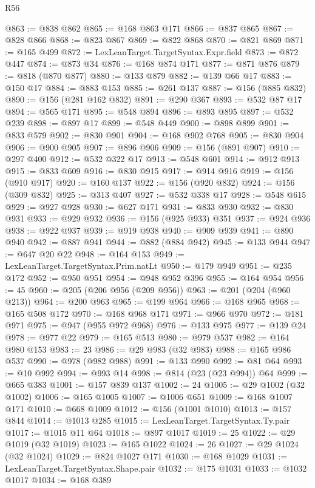 \begin{lexlean}{R56}
\begin{coremodule}
{{{{{{{{{{{{{{{{{{{{{{{{{{{{{{{{{{{{{{{{{{{{{{{{{{{{{{{{{{{{{{{{{{{{{{{{{{{{{{{{{{{{{{{{{{{{{{{{{{{{{{{{{{{{{{{{{{{{{{{{{{{{{{{{{{{{{{{{{{{{{{{{{{{{{{{{{{{{{{{{{{{{{{{{{{{{{{{{{{{{{{{{{{{{{{{{{{{{{{{{{{{{{{{{{{{@863 := @838 @862
@865 := @168 @863 @171
@866 := @837 @865
@867 := @828 @866
@868 := @823 @867
@869 := @822 @868
@870 := @821 @869
@871 := @165 @499
@872 := LexLeanTarget.TargetSyntax.Expr.field
@873 := @872 @447
@874 := @873 @34
@876 := @168 @874 @171
@877 := @871 @876
@879 := @818 (@870 @877)
@880 := @133 @879
@882 := @139 @66 @17
@883 := @150 @17
@884 := @883 @153
@885 := @261 @137
@887 := @156 (@885 @832)
@890 := @156 (@281 @162 @832)
@891 := @290 @367
@893 := @532 @87 @17
@894 := @565 @171
@895 := @548 @894
@896 := @893 @895
@897 := @532 @239
@898 := @897 @17
@899 := @548 @449
@900 := @898 @899
@901 := @833 @579
@902 := @830 @901
@904 := @168 @902 @768
@905 := @830 @904
@906 := @900 @905
@907 := @896 @906
@909 := @156 (@891 @907)
@910 := @297 @400
@912 := @532 @322 @17
@913 := @548 @601
@914 := @912 @913
@915 := @833 @609
@916 := @830 @915
@917 := @914 @916
@919 := @156 (@910 @917)
@920 := @160 @137
@922 := @156 (@920 @832)
@924 := @156 (@309 @832)
@925 := @313 @407
@927 := @532 @338 @17
@928 := @548 @615
@929 := @927 @928
@930 := @627 @171
@931 := @833 @930
@932 := @830 @931
@933 := @929 @932
@936 := @156 (@925 @933) @351
@937 := @924 @936
@938 := @922 @937
@939 := @919 @938
@940 := @909 @939
@941 := @890 @940
@942 := @887 @941
@944 := @882 (@884 @942)
@945 := @133 @944
@947 := @647 @20 @22
@948 := @164 @153
@949 := LexLeanTarget.TargetSyntax.Prim.natLt
@950 := @179 @949
@951 := @235 @172
@952 := @950 @951
@954 := @948 @952 @396
@955 := @164 @954
@956 := 45
@960 := @205 (@206 @956 (@209 @956))
@963 := @201 (@204 (@960 @213))
@964 := @200 @963
@965 := @199 @964
@966 := @168 @965
@968 := @165 @508 @172
@970 := @168 @968 @171
@971 := @966 @970
@972 := @181 @971
@975 := @947 (@955 @972 @968)
@976 := @133 @975
@977 := @139 @24
@978 := @977 @22
@979 := @165 @513
@980 := @979 @537
@982 := @164 @980 @153
@983 := 23
@986 := @29 @983 (@32 @983)
@988 := @165 @986 @537
@990 := @978 (@982 @988)
@991 := @133 @990
@992 := @81 @64
@993 := @10 @992
@994 := @993 @14
@998 := @814 (@23 (@23 @994)) @64
@999 := @665 @383
@1001 := @157 @839 @137
@1002 := 24
@1005 := @29 @1002 (@32 @1002)
@1006 := @165 @1005
@1007 := @1006 @651
@1009 := @168 @1007 @171
@1010 := @668 @1009
@1012 := @156 (@1001 @1010)
@1013 := @157 @844
@1014 := @1013 @285
@1015 := LexLeanTarget.TargetSyntax.Ty.pair
@1017 := @1015 @11 @64
@1018 := @897 @1017
@1019 := 25
@1022 := @29 @1019 (@32 @1019)
@1023 := @165 @1022
@1024 := 26
@1027 := @29 @1024 (@32 @1024)
@1029 := @824 @1027 @171
@1030 := @168 @1029
@1031 := LexLeanTarget.TargetSyntax.Shape.pair
@1032 := @175 @1031
@1033 := @1032 @1017
@1034 := @168 @389
}}}}}}}}}}}}}}}}}}}}}}}}}}}}}}}}}}}}}}}}}}}}}}}}}}}}}}}}}}}}}}}}}}}}}}}}}}}}}}}}}}}}}}}}}}}}}}}}}}}}}}}}}}}}}}}}}}}}}}}}}}}}}}}}}}}}}}}}}}}}}}}}}}}}}}}}}}}}}}}}}}}}}}}}}}}}}}}}}}}}}}}}}}}}}}}}}}}}}}}}}}}}}}}}}}}
\end{coremodule}
\end{lexlean}
